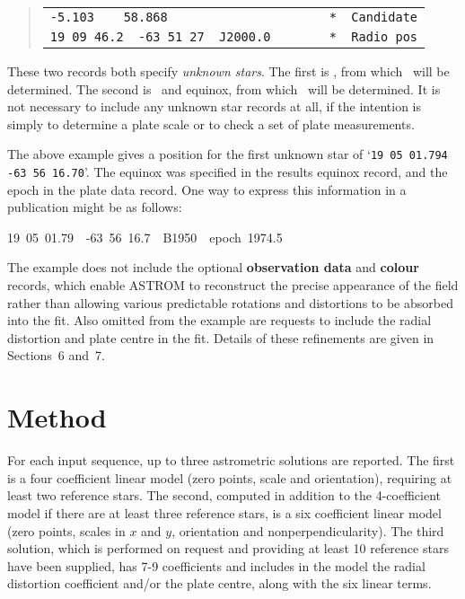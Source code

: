 \goodbreak
\begin{quote}
\begin{tabular}{|l|}
\hline
\verb|-5.103    58.868                      *  Candidate| \\
\verb|19 09 46.2  -63 51 27  J2000.0        *  Radio pos| \\
\hline
\end{tabular}
\end{quote}
These two records both specify {\it unknown stars}.  The
first is \xy, from which \radec\ will be determined.
The second is \radec\ and equinox, from which
\xy\ will be determined.
It is not necessary to include any
unknown star records at all, if the intention is
simply to determine a plate scale or to check
a set of plate measurements.

The above example gives a position for the first unknown
star of `\verb|19 05 01.794 -63 56 16.70|'.  The equinox was
specified in the results equinox record, and the epoch in
the plate data record.  One way to express this
information in a publication might be as follows:

\begin{center}
19~05~01.79~~-63~56~16.7~~B1950~~epoch~1974.5
\end{center}

The example does not include the
optional {\bf observation data} and {\bf colour}
records, which enable ASTROM to
reconstruct the precise appearance of the field rather
than allowing various predictable rotations and
distortions to be absorbed into the fit.  Also omitted from
the example are requests to include the radial distortion
and plate centre in the fit.  Details of
these refinements are given in Sections~6 and~7.

\section{Method}
For each input sequence, up to three astrometric solutions are
reported. The first is a four coefficient linear model (zero
points, scale and orientation),
requiring at least two reference stars.  The second, computed
in addition to the 4-coefficient model if there are at least
three reference stars, is a six coefficient linear model (zero
points, scales in $x$ and $y$, orientation and 
nonperpendicularity).  The third solution, which is performed on
request and providing at least 10 reference stars have been
supplied, has 7-9 coefficients and includes in the model the radial
distortion coefficient and/or the plate centre,
along with the six linear terms.

